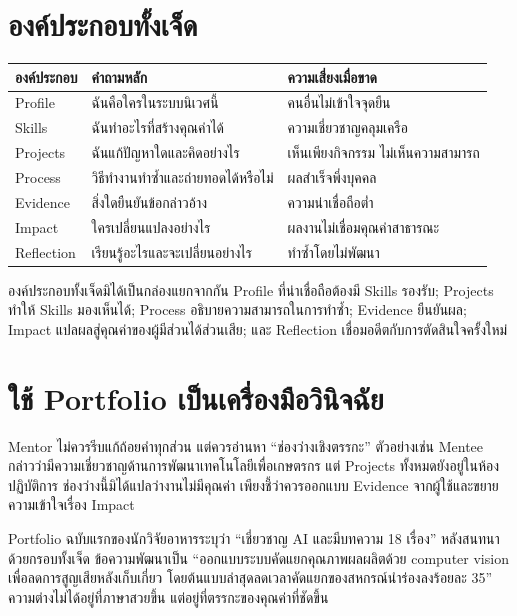 \section{องค์ประกอบทั้งเจ็ด}
\begin{longtable}{P{.2\textwidth}P{.34\textwidth}P{.34\textwidth}}
\toprule
\textbf{องค์ประกอบ} & \textbf{คำถามหลัก} & \textbf{ความเสี่ยงเมื่อขาด}\\
\midrule
Profile & ฉันคือใครในระบบนิเวศนี้ & คนอื่นไม่เข้าใจจุดยืน\\
Skills & ฉันทำอะไรที่สร้างคุณค่าได้ & ความเชี่ยวชาญคลุมเครือ\\
Projects & ฉันแก้ปัญหาใดและคิดอย่างไร & เห็นเพียงกิจกรรม ไม่เห็นความสามารถ\\
Process & วิธีทำงานทำซ้ำและถ่ายทอดได้หรือไม่ & ผลสำเร็จพึ่งบุคคล\\
Evidence & สิ่งใดยืนยันข้อกล่าวอ้าง & ความน่าเชื่อถือต่ำ\\
Impact & ใครเปลี่ยนแปลงอย่างไร & ผลงานไม่เชื่อมคุณค่าสาธารณะ\\
Reflection & เรียนรู้อะไรและจะเปลี่ยนอย่างไร & ทำซ้ำโดยไม่พัฒนา\\
\bottomrule
\end{longtable}

องค์ประกอบทั้งเจ็ดมิได้เป็นกล่องแยกจากกัน Profile ที่น่าเชื่อถือต้องมี Skills รองรับ; Projects ทำให้ Skills มองเห็นได้; Process อธิบายความสามารถในการทำซ้ำ; Evidence ยืนยันผล; Impact แปลผลสู่คุณค่าของผู้มีส่วนได้ส่วนเสีย; และ Reflection เชื่อมอดีตกับการตัดสินใจครั้งใหม่

\section{ใช้ Portfolio เป็นเครื่องมือวินิจฉัย}
Mentor ไม่ควรรีบแก้ถ้อยคำทุกส่วน แต่ควรอ่านหา \enquote{ช่องว่างเชิงตรรกะ} ตัวอย่างเช่น Mentee กล่าวว่ามีความเชี่ยวชาญด้านการพัฒนาเทคโนโลยีเพื่อเกษตรกร แต่ Projects ทั้งหมดยังอยู่ในห้องปฏิบัติการ ช่องว่างนี้มิได้แปลว่างานไม่มีคุณค่า เพียงชี้ว่าควรออกแบบ Evidence จากผู้ใช้และขยายความเข้าใจเรื่อง Impact

\begin{examplebox}
Portfolio ฉบับแรกของนักวิจัยอาหารระบุว่า \enquote{เชี่ยวชาญ AI และมีบทความ 18 เรื่อง} หลังสนทนาด้วยกรอบทั้งเจ็ด ข้อความพัฒนาเป็น \enquote{ออกแบบระบบคัดแยกคุณภาพผลผลิตด้วย computer vision เพื่อลดการสูญเสียหลังเก็บเกี่ยว โดยต้นแบบล่าสุดลดเวลาคัดแยกของสหกรณ์นำร่องลงร้อยละ 35} ความต่างไม่ได้อยู่ที่ภาษาสวยขึ้น แต่อยู่ที่ตรรกะของคุณค่าที่ชัดขึ้น
\end{examplebox}

